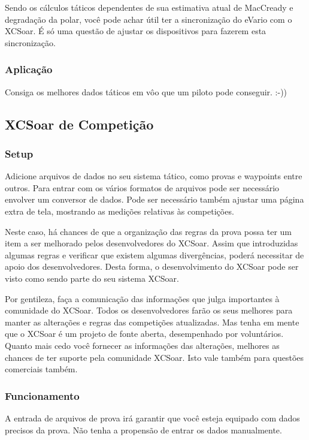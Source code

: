 Sendo os cálculos táticos dependentes de sua estimativa atual de MacCready e degradação da polar, você pode achar útil ter a sincronização do eVario com o XCSoar.  É só uma questão de ajustar os dispositivos para fazerem esta sincronização.


\subsubsection*{Aplicação} Consiga os melhores dados táticos em vôo que um piloto pode conseguir. :-))

\subsection*{XCSoar de Competição}
\subsubsection*{Setup} Adicione arquivos de dados no seu sistema tático, como provas e waypoints entre outros.  Para entrar com os vários formatos de arquivos pode ser necessário envolver um conversor de dados.  Pode ser necessário também ajustar uma página extra de tela, mostrando as medições relativas às competições.

Neste caso, há chances de que a organização das regras da prova possa ter um item a ser melhorado pelos desenvolvedores do XCSoar.  Assim que introduzidas algumas regras e verificar que existem algumas divergências, poderá necessitar de apoio dos desenvolvedores.  Desta forma, o desenvolvimento do XCSoar pode ser visto como sendo parte do seu sistema XCSoar.

Por gentileza, faça a comunicação das informações que julga importantes à comunidade do XCSoar.  Todos os desenvolvedores farão os seus melhores para manter as alterações e regras das competições atualizadas.  Mas tenha em mente que o XCSoar é um projeto de fonte aberta, desempenhado por voluntários.  Quanto mais cedo você fornecer as informações das alterações, melhores as chances de ter suporte pela comunidade XCSoar.  Isto vale também para questões comerciais também.  


\subsubsection*{Funcionamento} A entrada de arquivos de prova irá garantir que você esteja equipado com dados precisos da prova. Não tenha a propensão de entrar os dados manualmente.
 
